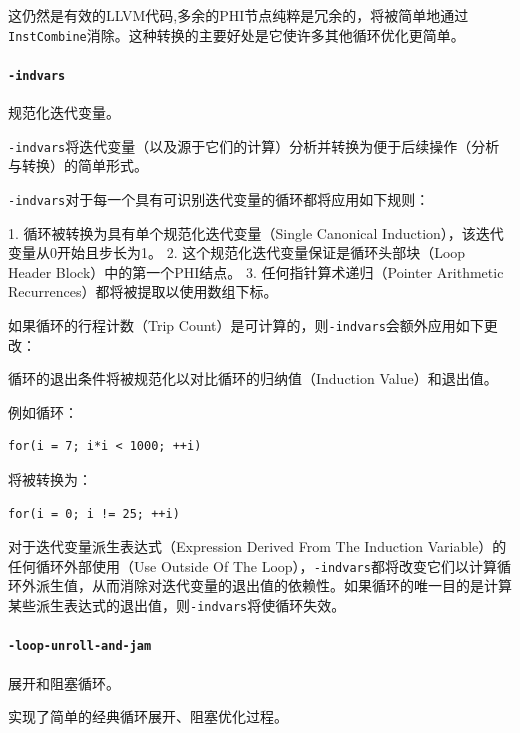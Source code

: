 \documentclass[lang=cn,11pt,a4paper,cite=authornum]{paper}
\begin{document}
这仍然是有效的LLVM代码,多余的PHI节点纯粹是冗余的，将被简单地通过\texttt{InstCombine}消除。这种转换的主要好处是它使许多其他循环优化更简单。

\paragraph{\texttt{-indvars}} 规范化迭代变量。

\texttt{-indvars}将迭代变量（以及源于它们的计算）分析并转换为便于后续操作（分析与转换）的简单形式。

\texttt{-indvars}对于每一个具有可识别迭代变量的循环都将应用如下规则：

1. 循环被转换为具有单个规范化迭代变量（Single Canonical Induction），该迭代变量从0开始且步长为1。
2. 这个规范化迭代变量保证是循环头部块（Loop Header Block）中的第一个PHI结点。
3. 任何指针算术递归（Pointer Arithmetic Recurrences）都将被提取以使用数组下标。

如果循环的行程计数（Trip Count）是可计算的，则\texttt{-indvars}会额外应用如下更改：

循环的退出条件将被规范化以对比循环的归纳值（Induction Value）和退出值。

例如循环：

\begin{code}
    \begin{verbatim}
for(i = 7; i*i < 1000; ++i)
\end{verbatim}
\end{code}

将被转换为：

\begin{code}
    \begin{verbatim}
for(i = 0; i != 25; ++i)
\end{verbatim}
\end{code}

对于迭代变量派生表达式（Expression Derived From The Induction Variable）的任何循环外部使用（Use Outside Of The Loop），\texttt{-indvars}都将改变它们以计算循环外派生值，从而消除对迭代变量的退出值的依赖性。如果循环的唯一目的是计算某些派生表达式的退出值，则\texttt{-indvars}将使循环失效。

\paragraph{\texttt{-loop-unroll-and-jam}} 展开和阻塞循环。

实现了简单的经典循环展开、阻塞优化过程。
\end{document}
